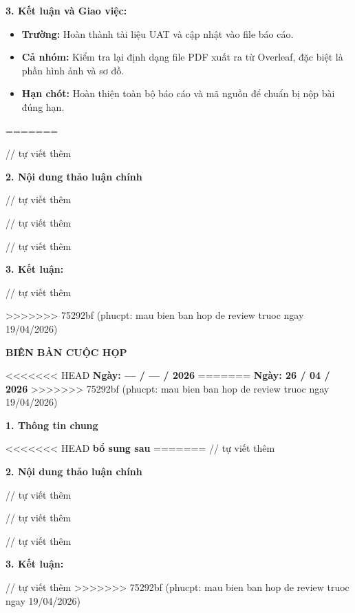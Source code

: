 \documentclass[12pt,a4paper]{article}
\begin{document}
\vspace{2pt}
\textbf{3. Kết luận và Giao việc:}
\begin{itemize}
    \item \textbf{Trường:} Hoàn thành tài liệu UAT và cập nhật vào file báo cáo.
    \item \textbf{Cả nhóm:} Kiểm tra lại định dạng file PDF xuất ra từ Overleaf, đặc biệt là phần hình ảnh và sơ đồ.
    \item \textbf{Hạn chót:} Hoàn thiện toàn bộ báo cáo và mã nguồn để chuẩn bị nộp bài đúng hạn.
\end{itemize}

=======

// tự viết thêm

\textbf{2. Nội dung thảo luận chính}

// tự viết thêm

// tự viết thêm


// tự viết thêm

\vspace{2pt}
\textbf{3. Kết luận:}

// tự viết thêm

>>>>>>> 75292bf (phucpt: mau bien ban hop de review truoc ngay 19/04/2026)
\newpage

\begin{center}
    {\large\bfseries BIÊN BẢN CUỘC HỌP}
\end{center}
\begin{center}
<<<<<<< HEAD
    \textbf{Ngày: --- / --- / 2026}
=======
    \textbf{Ngày: 26 / 04 / 2026}
>>>>>>> 75292bf (phucpt: mau bien ban hop de review truoc ngay 19/04/2026)
\end{center}
\vspace{0.4em}

\textbf{1. Thông tin chung}

<<<<<<< HEAD
\textbf{bổ sung sau}
=======
// tự viết thêm

\textbf{2. Nội dung thảo luận chính}

// tự viết thêm

// tự viết thêm


// tự viết thêm

\vspace{2pt}
\textbf{3. Kết luận:}

// tự viết thêm
>>>>>>> 75292bf (phucpt: mau bien ban hop de review truoc ngay 19/04/2026)

\label{LastPageMeetingMinute} 
\end{document}
